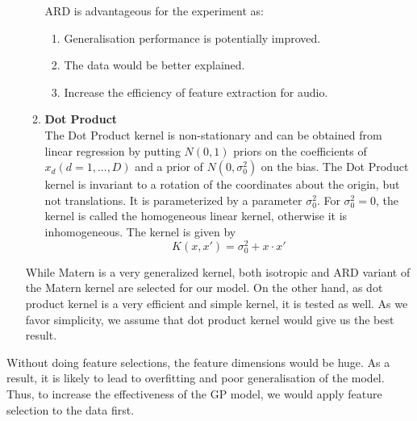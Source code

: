 \documentclass{article}
\begin{document}
\begin{enumerate}
\begin{enumerate}
			ARD is advantageous for the experiment as: 
			\begin{enumerate}
				\item Generalisation performance is potentially improved.
				\item The data would be better explained.
				\item Increase the efficiency of feature extraction for audio.
			\end{enumerate}
			\cite{Cawley2014}
			
			\item \textbf{Dot Product}\\
			The Dot Product kernel is non-stationary and can be obtained from linear regression by putting $N(0,1)$ priors on the coefficients 
			of $x_{d} (d = 1, . . . , D)$ and a prior of $N(0, \sigma_{0}^{2})$ on the bias. 
			The Dot Product kernel is invariant to a rotation of the coordinates about the origin, but not translations. 
			It is parameterized by a parameter $\sigma_{0}^{2}$. For $\sigma_{0}^{2} = 0$, 
			the kernel is called the homogeneous linear kernel, otherwise it is inhomogeneous. The kernel is given by
			\begin{equation}\label{eq:kernel_dp}
				K(x,x') = \sigma_{0}^{2} + x \cdot x'  
			\end{equation}
		\end{enumerate}

		While Matern is a very generalized kernel, both isotropic and ARD variant of the Matern kernel are selected for our model. 
		On the other hand, as dot product kernel is a very efficient and simple kernel, it is tested as well. 
		As we favor simplicity, we assume that dot product kernel would give us the best result.
	\end{enumerate}

	Without doing feature selections, the feature dimensions would be huge. 
	As a result, it is likely to lead to overfitting and poor generalisation of the model. \cite{Cawley2014} 
	Thus, to increase the effectiveness of the GP model, we would apply feature selection to the data first.
\end{document}
